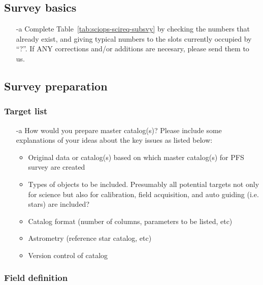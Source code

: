 \documentclass[a4paper,notitlepage]{article}
\newcommand{\colm}[1]{\textcolor{ccolm}{\thesubsubsection-#1}}
\begin{document}
\subsection{Survey basics}

\begin{enumerate}
  \item[\colm{a}] Complete Table~\ref{tab:sciops-scireq-subsvy} by
           checking the numbers that already exist, and giving
           typical numbers to the slots currently occupied by
           ``?''. If ANY corrections and/or additions are necesary,
           please send them to us.
\end{enumerate}

\subsection{Survey preparation}

\subsubsection{Target list}

\begin{enumerate}
 \item[\colm{a}] How would you prepare master catalog(s)?  Please
          include some explanations of your ideas about the key
          issues as listed below:
          \begin{itemize}
           \item Original data or catalog(s) based on which master
             catalog(s) for PFS survey are created
           \item Types of objects to be included. Presumably all
             potential targets not only for science but also for
             calibration, field acquisition, and auto guiding
             (i.e. stars) are included?
           \item Catalog format (number of columns, parameters to be
             listed, etc)
           \item Astrometry (reference star catalog, etc)
           \item Version control of catalog
          \end{itemize}
\end{enumerate}

\subsubsection{Field definition}
\end{document}
